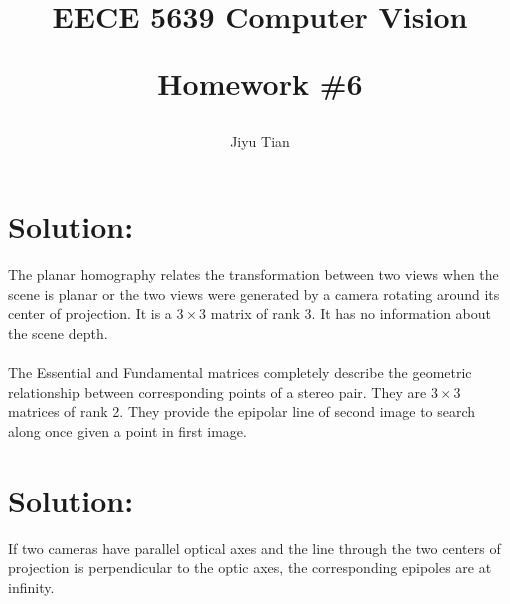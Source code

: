 \documentclass[12pt]{article}
\title{EECE 5639 Computer Vision\\ [2ex] \begin{large} Homework \#6 \end{large} }
\author{Jiyu Tian}
\date{}
\begin{document}
\maketitle
\pagestyle{empty}
\section{Solution:}
The planar homography relates the transformation between two views when the scene is planar or the two views were generated by a camera rotating around its center of projection. It is a $3\times3$ matrix of rank 3. It has no information about the scene depth.\\
\\
The Essential and Fundamental matrices completely describe the geometric relationship between corresponding points of a stereo pair. They are $3\times3$ matrices of rank 2. They provide the epipolar line of second image to search along once given a point in first image.
\section{Solution:}
If two cameras have parallel optical axes and the line through the two centers of projection is perpendicular to the optic axes, the corresponding epipoles are at infinity.

\end{document}
